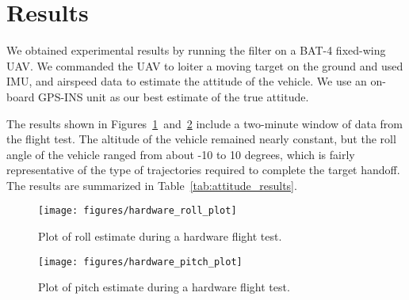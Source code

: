\section{Results}
We obtained experimental results by running the filter on a BAT-4 fixed-wing UAV. We commanded the UAV to loiter a moving target on the ground and used IMU, and airspeed data to estimate the attitude of the vehicle. We use an on-board GPS-INS unit as our best estimate of the true attitude.

The results shown in Figures~\ref{fig:roll_plot}~and~\ref{fig:pitch_plot} include a two-minute window of data from the flight test. The altitude of the vehicle remained nearly constant, but the roll angle of the vehicle ranged from about -10 to 10 degrees, which is fairly representative of the type of trajectories required to complete the target handoff. The results are summarized in Table~\ref{tab:attitude_results}.

\begin{figure}[hbt]
	\centering
	\texttt{[image: figures/hardware\_roll\_plot]}
	\caption{Plot of roll estimate during a hardware flight test.}
	\label{fig:roll_plot}
\end{figure}

\begin{figure}[hbt]
	\centering
	\texttt{[image: figures/hardware\_pitch\_plot]}
	\caption{Plot of pitch estimate during a hardware flight test.}
	\label{fig:pitch_plot}
\end{figure}

\begin{table}[hbt]
  \caption{Self-pose attitude estimation results}
	\label{tab:attitude_results}
\end{table}

